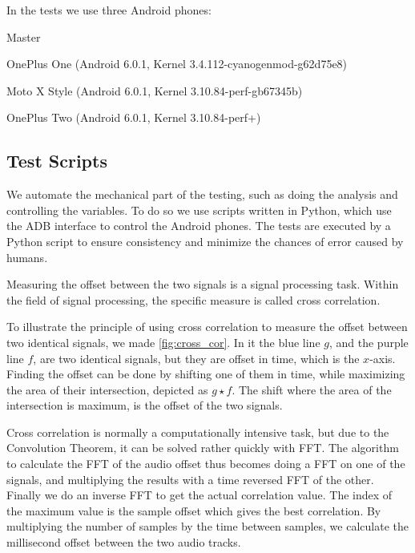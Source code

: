 In the tests we use three Android phones:
\begin{dankscription}{\bfseries}{Master}
	\item[Master]OnePlus One (Android 6.0.1, Kernel 3.4.112-cyanogenmod-g62d75e8)
	\item[Slave 1]Moto X Style (Android 6.0.1, Kernel 3.10.84-perf-gb67345b)
	\item[Slave 2]OnePlus Two (Android 6.0.1, Kernel 3.10.84-perf+)
\end{dankscription}

\subsection{Test Scripts}
We automate the mechanical part of the testing, such as doing the
analysis and controlling the variables. To do so we use scripts written
in Python, which use the \ac{ADB} interface to control the Android
phones. The tests are executed by a Python script to ensure
consistency and minimize the chances of error caused by humans.

Measuring the offset between the two signals is a signal processing
task. Within the field of signal processing, the specific measure is
called cross correlation. 

To illustrate the principle of using cross correlation to measure the offset between two identical signals, we made \cref{fig:cross_cor}.
In it the blue line $g$, and the purple line $f$, are two identical signals, but they are offset in time, which is the $x$-axis.
Finding the offset can be done by shifting one of them in time, while maximizing the area of their intersection, depicted as $g \star f$.
The shift where the area of the intersection is maximum, is the offset of the two signals.

Cross correlation is normally
a computationally intensive task, but due to the Convolution
Theorem\cite{conv_theo}, it can be solved rather quickly with \ac{FFT}.
The algorithm to calculate the \ac{FFT} of the audio offset thus becomes
doing a \ac{FFT} on one of the signals, and multiplying the results with
a time reversed \ac{FFT} of the other. Finally we do an inverse \ac{FFT}
to get the actual correlation value. The index of the maximum value is
the sample offset which gives the best correlation.
By multiplying the
number of samples by the time between samples, we calculate the
millisecond offset between the two audio tracks.




